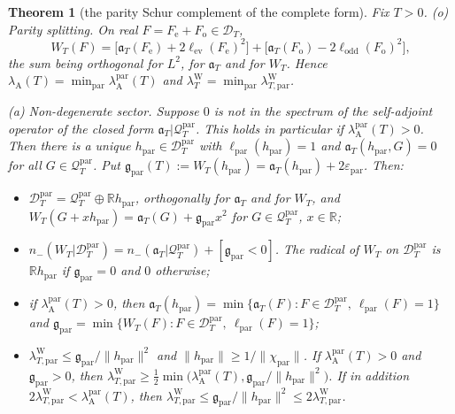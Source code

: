 \documentclass[11pt]{amsart}
\newtheorem{theorem}{Theorem}[section]
\theoremstyle{definition}
\theoremstyle{remark}
\newcommand{\R}{\mathbb R}
\newcommand{\lamW}{\lambda^{\mathrm W}_T}
\newcommand{\lamA}{\lambda_{\mathrm A}(T)}
\begin{document}
\begin{theorem}[the parity Schur complement of the complete form]\label{thm:parityschur}
Fix $T>0$.
\emph{(o) Parity splitting.} On real $F=F_{\mathrm e}+F_{\mathrm o}\in\mathcal D_T$,
\[
W_T(F)=\big[\mathfrak a_T(F_{\mathrm e})+2\ell_{\mathrm{ev}}(F_{\mathrm e})^2\big]
+\big[\mathfrak a_T(F_{\mathrm o})-2\ell_{\mathrm{odd}}(F_{\mathrm o})^2\big],
\]
the sum being orthogonal for $L^2$, for $\mathfrak a_T$ and for $W_T$. Hence
$\lamA=\min_{\mathrm{par}}\lambda^{\mathrm{par}}_{\mathrm A}(T)$ and $\lamW=\min_{\mathrm{par}}\lambda^{\mathrm W}_{T,\mathrm{par}}$.

\emph{(a) Non-degenerate sector.} Suppose $0$ is not in the spectrum of the self-adjoint operator of the
closed form $\mathfrak a_T|\mathcal Q^{\mathrm{par}}_T$. This holds in particular if
$\lambda^{\mathrm{par}}_{\mathrm A}(T)>0$. Then there is a unique $h_{\mathrm{par}}\in\mathcal D^{\mathrm{par}}_T$
with $\ell_{\mathrm{par}}(h_{\mathrm{par}})=1$ and $\mathfrak a_T(h_{\mathrm{par}},G)=0$ for all
$G\in\mathcal Q^{\mathrm{par}}_T$. Put $\mathfrak g_{\mathrm{par}}(T):=W_T(h_{\mathrm{par}})=\mathfrak a_T(h_{\mathrm{par}})+2\varepsilon_{\mathrm{par}}$.
Then:
\begin{itemize}
\item[(a1)] $\mathcal D^{\mathrm{par}}_T=\mathcal Q^{\mathrm{par}}_T\oplus\R h_{\mathrm{par}}$, orthogonally for
$\mathfrak a_T$ and for $W_T$, and $W_T(G+xh_{\mathrm{par}})=\mathfrak a_T(G)+\mathfrak g_{\mathrm{par}}x^2$ for
$G\in\mathcal Q^{\mathrm{par}}_T$, $x\in\R$;
\item[(a2)] $n_-(W_T|\mathcal D^{\mathrm{par}}_T)=n_-(\mathfrak a_T|\mathcal Q^{\mathrm{par}}_T)+[\mathfrak g_{\mathrm{par}}<0]$.
The radical of $W_T$ on $\mathcal D^{\mathrm{par}}_T$ is $\R h_{\mathrm{par}}$ if $\mathfrak g_{\mathrm{par}}=0$ and $0$
otherwise;
\item[(a3)] if $\lambda^{\mathrm{par}}_{\mathrm A}(T)>0$, then
$\mathfrak a_T(h_{\mathrm{par}})=\min\{\mathfrak a_T(F):F\in\mathcal D^{\mathrm{par}}_T,\ \ell_{\mathrm{par}}(F)=1\}$ and
$\mathfrak g_{\mathrm{par}}=\min\{W_T(F):F\in\mathcal D^{\mathrm{par}}_T,\ \ell_{\mathrm{par}}(F)=1\}$;
\item[(a4)] $\lambda^{\mathrm W}_{T,\mathrm{par}}\le\mathfrak g_{\mathrm{par}}/\|h_{\mathrm{par}}\|^2$ and
$\|h_{\mathrm{par}}\|\ge1/\|\chi_{\mathrm{par}}\|$. If $\lambda^{\mathrm{par}}_{\mathrm A}(T)>0$ \emph{and}
$\mathfrak g_{\mathrm{par}}>0$, then
$\lambda^{\mathrm W}_{T,\mathrm{par}}\ge\frac12\min\big(\lambda^{\mathrm{par}}_{\mathrm A}(T),\mathfrak g_{\mathrm{par}}/\|h_{\mathrm{par}}\|^2\big)$.
If in addition $2\lambda^{\mathrm W}_{T,\mathrm{par}}<\lambda^{\mathrm{par}}_{\mathrm A}(T)$, then
$\lambda^{\mathrm W}_{T,\mathrm{par}}\le\mathfrak g_{\mathrm{par}}/\|h_{\mathrm{par}}\|^2\le2\lambda^{\mathrm W}_{T,\mathrm{par}}$.
\end{itemize}


\end{theorem}
\end{document}
